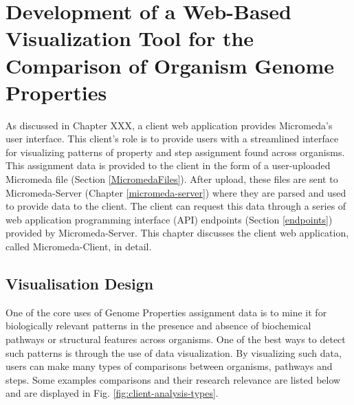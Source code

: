\chapter{Development of a Web-Based Visualization Tool for the Comparison of Organism Genome Properties} \label{micromeda-client}

As discussed in Chapter XXX, a client web application provides Micromeda's user interface. This client's role is to provide users with a streamlined interface for visualizing patterns of property and step assignment found across organisms. This assignment data is provided to the client in the form of a user-uploaded Micromeda file (Section \ref{MicromedaFiles}). After upload, these files are sent to Micromeda-Server (Chapter \ref{micromeda-server}) where they are parsed and used to provide data to the client. The client can request this data through a series of web application programming interface (API) endpoints (Section \ref{endpoints}) provided by Micromeda-Server. This chapter discusses the client web application, called Micromeda-Client, in detail.

\section{Visualisation Design} \label{visualization-design}

One of the core uses of Genome Properties assignment data is to mine it for biologically relevant patterns in the presence and absence of biochemical pathways or structural features across organisms. One of the best ways to detect such patterns is through the use of data visualization. By visualizing such data, users can make many types of comparisons between organisms, pathways and steps. Some examples comparisons and their research relevance are listed below and are displayed in Fig. \ref{fig:client-analysis-types}. 

